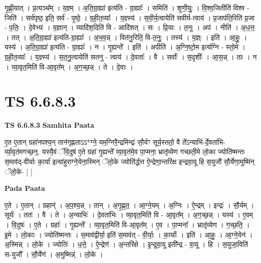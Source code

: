 \documentclass[17pt]{extarticle}
\begin{document}
गृ॒ह्णी॒यात् । प्र॒त्यञ्च᳚म् । य॒ज्ञ्म् । अ॒ति॒ग्रा॒ह्या॑ इत्य॑ति - ग्रा॒ह्याः᳚ । समिति॑ । शृ॒णी॒युः॒ । वि॒श्व॒जितीति॑ विश्व - जिति॑ । सर्व॑पृष्ठ॒ इति॒ सर्व॑ - पृ॒ष्ठे॒ । ग्र॒ही॒त॒व्याः᳚ । य॒ज्ञ्स्य॑ । स॒वी॒र्य॒त्वायेति॑ सवीर्य-त्वाय॑ । प्र॒जाप॑ति॒रिति॑ प्र॒जा - प॒तिः॒ । दे॒वेभ्यः॑ । य॒ज्ञान् । व्यादि॑श॒दिति॑ वि - आदि॑शत् । सः । प्रि॒याः । त॒नूः । अप॑ । नीति॑ । अ॒ध॒त्त॒ । तत् । अ॒ति॒ग्रा॒ह्या॑ इत्य॑ति-ग्रा॒ह्याः᳚ । अ॒भ॒व॒न्न् । वित॑नु॒रिति॒ वि-त॒नुः॒ । तस्य॑ । य॒ज्ञ्ः । इति॑ । आ॒हुः॒ । यस्य॑ । अ॒ति॒ग्रा॒ह्या॑ इत्य॑ति - ग्रा॒ह्याः᳚ । न । गृ॒ह्यन्ते᳚ । इति॑ । अपीति॑ । अ॒ग्नि॒ष्टो॒म इत्य॑ग्नि - स्तो॒मे । ग्र॒ही॒त॒व्याः᳚ । य॒ज्ञ्स्य॑ । स॒त॒नु॒त्वायेति॑ सतनु - त्वाय॑ । दे॒वताः᳚ । वै । सर्वाः᳚ । स॒दृशीः᳚ । आ॒स॒न्न् । ताः । न । व्या॒वृत॒मिति॑ वि-आ॒वृत᳚म् । अ॒ग॒च्छ॒न्न् । ते । दे॒वाः ।  \newline





\section{ TS 6.6.8.3 }

\textbf{TS 6.6.8.3 } \newline
\textbf{Samhita Paata} \newline

ए॒त ए॒तान् ग्रहा॑नपश्य॒न् तान॑गृह्णताऽऽ*ग्ने॒ यम॒ग्निरै॒न्द्रमिन्द्रः॑ सौ॒र्यꣳ सूर्य॒स्ततो॒ वै ते᳚ऽन्याभि॑-र्दे॒वता॑भि-र्व्या॒वृत॑मगच्छ॒न्॒. यस्यै॒वं ॅवि॒दुष॑ ए॒ते ग्रहा॑ गृ॒ह्यन्ते᳚ व्या॒वृत॑मे॒व पा॒प्मना॒ भ्रातृ॑व्येण गच्छती॒मे लो॒का ज्योति॑ष्मन्तः स॒माव॑द्-वीर्याः का॒र्या॑ इत्या॑हुराग्ने॒येना॒स्मिन् ॅलो॒के ज्योति॑र्द्धत्त ऐ॒न्द्रेणा॒न्तरि॑क्ष इन्द्रवा॒यू हि स॒युजौ॑ सौ॒र्येणा॒मुष्मि॑न् ॅलो॒के- [  ] \newline

\textbf{Pada Paata} \newline

ए॒ते । ए॒तान् । ग्रहान्॑ । अ॒प॒श्य॒न्न् । तान् । अ॒गृ॒ह्ण॒त॒ । आ॒ग्ने॒यम् । अ॒ग्निः । ऐ॒न्द्रम् । इन्द्रः॑ । सौ॒र्यम् । सूर्यः॑ । ततः॑ । वै । ते । अ॒न्याभिः॑ । दे॒वता॑भिः । व्या॒वृत॒मिति॑ वि - आ॒वृत᳚म् । अ॒ग॒च्छ॒न्न् । यस्य॑ । ए॒वम् । वि॒दुषः॑ । ए॒ते । ग्रहाः᳚ । गृ॒ह्यन्ते᳚ । व्या॒वृत॒मिति॑ वि-आ॒वृत᳚म् । ए॒व । पा॒प्मना᳚ । भ्रातृ॑व्येण । ग॒च्छ॒ति॒ । इ॒मे । लो॒काः । ज्योति॑ष्मन्तः । स॒माव॑द्वीर्या॒ इति॑ स॒माव॑त् - वी॒र्याः॒ । का॒र्याः᳚ । इति॑ । आ॒हुः॒ । आ॒ग्ने॒येन॑ । अ॒स्मिन्न् । लो॒के । ज्योतिः॑ । ध॒त्ते॒ । ऐ॒न्द्रेण॑ । अ॒न्तरि॑क्षे । इ॒न्द्र॒वा॒यू इती᳚न्द्र - वा॒यू । हि । स॒युजा॒विति॑ स-युजौ᳚ । सौ॒र्येण॑ । अ॒मुष्मिन्न्॑ । लो॒के ।  \newline
\end{document}

